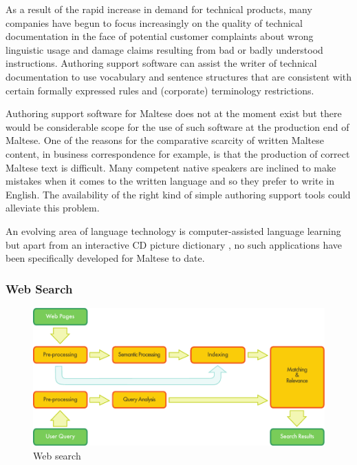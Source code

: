 \begin{multicols}{2}
As a result of the rapid increase in demand for technical products, many companies have begun to focus increasingly on the quality of technical documentation in the face of potential customer complaints about wrong linguistic usage and damage claims resulting from bad or badly understood instructions. Authoring support software can assist the writer of technical documentation to use vocabulary and sentence structures that are consistent with certain formally expressed rules and (corporate) terminology restrictions.

Authoring support software for Maltese does not at the moment exist but there would be considerable scope for the use of such software at the production end of Maltese. One of the reasons for the comparative scarcity of written Maltese content, in business correspondence for example, is that the production of correct Maltese text is difficult. Many competent native speakers are inclined to make mistakes when it comes to the written language and so they prefer to write in English. The availability of the right kind of simple authoring support tools could alleviate this problem.

An evolving area of language technology is computer-assisted language learning but apart from an interactive CD picture dictionary \cite{Sciriha:1997}, no such applications have been specifically developed for Maltese to date.

\subsubsection{Web Search}

\begin{figure}[htb]
  \center
  \includegraphics[width=\textwidth]{../_media/english/web_search_architecture}
  \caption{Web search}
\label{fig:websearcharch_en}
 \end{figure}


\end{multicols}
